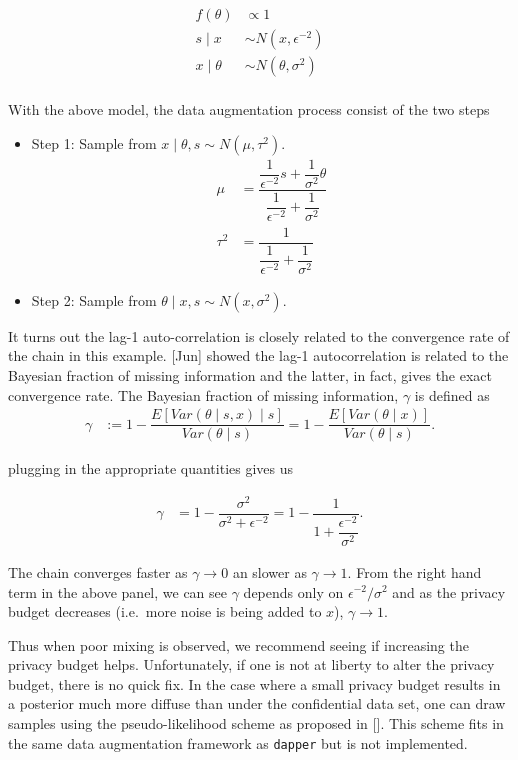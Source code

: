 \[
\begin{aligned}
f(\theta) &\propto 1\\
s \mid x &\sim N(x, \epsilon^{-2})\\
x \mid \theta &\sim N(\theta, \sigma^2)\\
\end{aligned}
\]

With the above model, the data augmentation process consist of the
two steps

\begin{itemize}
\item
  Step 1: Sample from \(x \mid \theta, s \sim N(\mu, \tau^2)\).
  \[
  \begin{aligned}
  \mu &= \dfrac{\dfrac{1}{\epsilon^{-2}}s + \dfrac{1}{\sigma^2}\theta}{\dfrac{1}{\epsilon^{-2}} + \dfrac{1}{\sigma^2}}\\
  \tau^2 &= \dfrac{1}{\dfrac{1}{\epsilon^{-2}} + \dfrac{1}{\sigma^2}}
  \end{aligned}
  \]
\item
  Step 2: Sample from \(\theta \mid x, s \sim N(x, \sigma^2)\).
\end{itemize}

It turns out the lag-1 auto-correlation is closely related
to the convergence rate of the chain in this example. {[}Jun{]} showed
the lag-1 autocorrelation is related to the Bayesian fraction of missing information
and the latter, in fact, gives the exact convergence rate. The Bayesian fraction of missing information, \(\gamma\) is
defined as
\begin{align*}
\gamma &:= 1 - \dfrac{E[Var(\theta \mid s, x) \mid s]}{Var(\theta \mid s)} = 1 - \dfrac{E[Var(\theta \mid x)]}{Var(\theta \mid s)}.
\end{align*}

plugging in the appropriate quantities gives us

\begin{align*}
\gamma &= 1 - \dfrac{\sigma^2}{\sigma^2 + \epsilon^{-2}} = 1 - \dfrac{1}{1 + \dfrac{\epsilon^{-2}}{\sigma^2}}.
\end{align*}

The chain converges faster as \(\gamma \to 0\) an slower as \(\gamma \to 1\).
From the right hand term in the above panel, we can see \(\gamma\)
depends only on \(\epsilon^{-2}/\sigma^2\) and as the privacy budget decreases (i.e.~more noise is being added to \(x\)),
\(\gamma \to 1\).

Thus when poor mixing is observed, we recommend seeing if increasing the privacy
budget helps. Unfortunately, if one is not at liberty to alter the privacy budget,
there is no quick fix. In the case where a small privacy budget results
in a posterior much more diffuse than under the confidential data set, one
can draw samples using the pseudo-likelihood scheme as proposed in {[}{]}. This
scheme fits in the same data augmentation framework as \texttt{dapper} but is not implemented.

